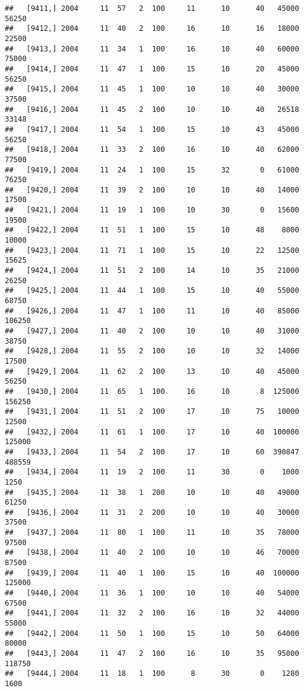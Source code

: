 \documentclass{article}\usepackage[]{graphicx}\usepackage[]{color}
\makeatletter
\newenvironment{kframe}{%
 \def\at@end@of@kframe{}%
 \ifinner\ifhmode%
  \def\at@end@of@kframe{\end{minipage}}%
  \begin{minipage}{\columnwidth}%
 \fi\fi%
 \def\FrameCommand##1{\hskip\@totalleftmargin \hskip-\fboxsep
 \colorbox{shadecolor}{##1}\hskip-\fboxsep
     \hskip-\linewidth \hskip-\@totalleftmargin \hskip\columnwidth}%
 \MakeFramed {\advance\hsize-\width
   \@totalleftmargin\z@ \linewidth\hsize
   \@setminipage}}%
 {\par\unskip\endMakeFramed%
 \at@end@of@kframe}
\newenvironment{knitrout}{}{} %
\makeatother
\begin{document}
\begin{knitrout}
\begin{kframe}
\begin{verbatim}
##   [9411,] 2004     11  57   2  100     11      10      40   45000   56250
##   [9412,] 2004     11  40   2  100     16      10      16   18000   22500
##   [9413,] 2004     11  34   1  100     16      10      40   60000   75000
##   [9414,] 2004     11  47   1  100     15      10      20   45000   56250
##   [9415,] 2004     11  45   1  100     10      10      40   30000   37500
##   [9416,] 2004     11  45   2  100     10      10      40   26518   33148
##   [9417,] 2004     11  54   1  100     15      10      43   45000   56250
##   [9418,] 2004     11  33   2  100     16      10      40   62000   77500
##   [9419,] 2004     11  24   1  100     15      32       0   61000   76250
##   [9420,] 2004     11  39   2  100     10      10      40   14000   17500
##   [9421,] 2004     11  19   1  100     10      30       0   15600   19500
##   [9422,] 2004     11  51   1  100     15      10      48    8000   10000
##   [9423,] 2004     11  71   1  100     15      10      22   12500   15625
##   [9424,] 2004     11  51   2  100     14      10      35   21000   26250
##   [9425,] 2004     11  44   1  100     15      10      40   55000   68750
##   [9426,] 2004     11  47   1  100     11      10      40   85000  106250
##   [9427,] 2004     11  40   2  100     10      10      40   31000   38750
##   [9428,] 2004     11  55   2  100     10      10      32   14000   17500
##   [9429,] 2004     11  62   2  100     13      10      40   45000   56250
##   [9430,] 2004     11  65   1  100     16      10       8  125000  156250
##   [9431,] 2004     11  51   2  100     17      10      75   10000   12500
##   [9432,] 2004     11  61   1  100     17      10      40  100000  125000
##   [9433,] 2004     11  54   2  100     17      10      60  390847  488559
##   [9434,] 2004     11  19   2  100     11      30       0    1000    1250
##   [9435,] 2004     11  38   1  200     10      10      40   49000   61250
##   [9436,] 2004     11  31   2  200     10      10      40   30000   37500
##   [9437,] 2004     11  80   1  100     11      10      35   78000   97500
##   [9438,] 2004     11  40   2  100     10      10      46   70000   87500
##   [9439,] 2004     11  40   1  100     15      10      40  100000  125000
##   [9440,] 2004     11  36   1  100     10      10      40   54000   67500
##   [9441,] 2004     11  32   2  100     16      10      32   44000   55000
##   [9442,] 2004     11  50   1  100     15      10      50   64000   80000
##   [9443,] 2004     11  47   2  100     16      10      35   95000  118750
##   [9444,] 2004     11  18   1  100      8      30       0    1280    1600

\end{verbatim}
\end{kframe}
\end{knitrout}
\end{document}
